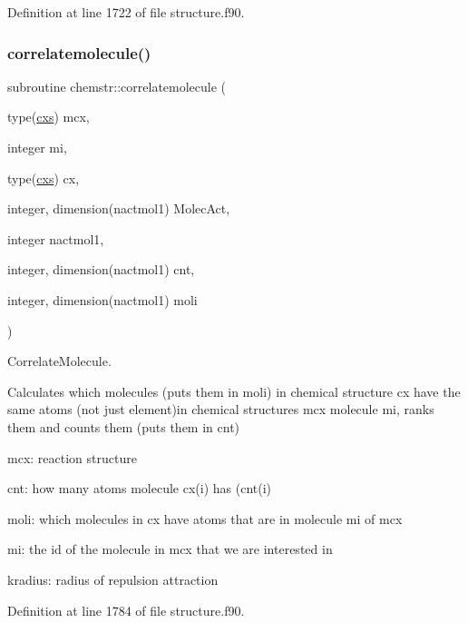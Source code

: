 Definition at line 1722 of file structure.\+f90.

\mbox{\label{namespacechemstr_a440319c79068791288579e71bf50a5a2}} 
\subsubsection{\texorpdfstring{correlatemolecule()}{correlatemolecule()}}
{\footnotesize\ttfamily subroutine chemstr\+::correlatemolecule (\begin{DoxyParamCaption}\item[{type(\mbox{\hyperlink{structchemstr_1_1cxs}{cxs}})}]{mcx,  }\item[{integer}]{mi,  }\item[{type(\mbox{\hyperlink{structchemstr_1_1cxs}{cxs}})}]{cx,  }\item[{integer, dimension(nactmol1)}]{Molec\+Act,  }\item[{integer}]{nactmol1,  }\item[{integer, dimension(nactmol1)}]{cnt,  }\item[{integer, dimension(nactmol1)}]{moli }\end{DoxyParamCaption})}



Correlate\+Molecule. 

Calculates which molecules (puts them in moli) in chemical structure cx have the same atoms (not just element)in chemical structures mcx molecule mi, ranks them and counts them (puts them in cnt)


\begin{DoxyItemize}
\item mcx\+: reaction structure
\item cnt\+: how many atoms molecule cx(i) has (cnt(i)
\item moli\+: which molecules in cx have atoms that are in molecule mi of mcx
\item mi\+: the id of the molecule in mcx that we are interested in
\item kradius\+: radius of repulsion attraction 
\end{DoxyItemize}

Definition at line 1784 of file structure.\+f90.

\mbox{\label{namespacechemstr_a2deb37a2e94b8dc83c28990d66806a50}} 
